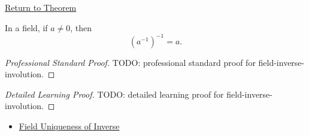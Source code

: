 \newpage
{}
\label{prf:field-inverse-involution}

\begin{remark*}[Return]
\hyperref[thm:field-inverse-involution]{Return to Theorem}
\end{remark*}

\begin{theorem*}
In a field, if $a\ne0$, then
\[
(a^{-1})^{-1}=a.
\]
\end{theorem*}

\begin{proof}[Professional Standard Proof]
\LRAProofBodyStart
TODO: professional standard proof for field-inverse-involution.
\end{proof}

\begin{proof}[Detailed Learning Proof]
\LRAProofBodyStart
TODO: detailed learning proof for field-inverse-involution.
\end{proof}

\begin{remark*}
\end{remark*}

\begin{dependencies}
\begin{itemize}
  \item \hyperref[thm:field-uniqueness-of-inverse]{Field Uniqueness of Inverse}
\end{itemize}
\end{dependencies}

\clearpage
